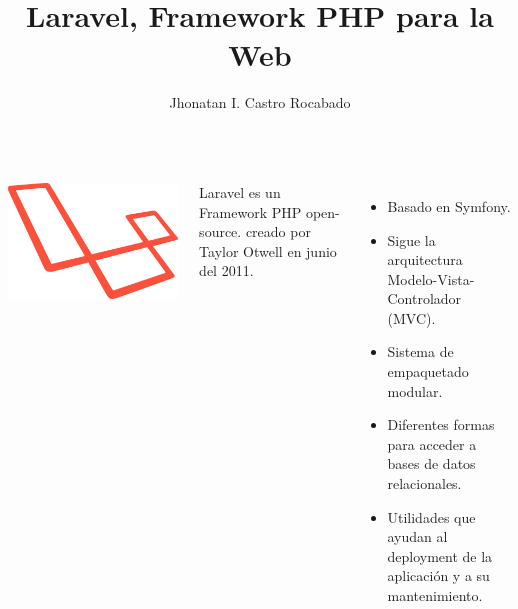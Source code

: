 \documentclass{beamer} %
\title{Laravel, Framework PHP para la Web}
\author{Jhonatan I. Castro Rocabado}
\begin{document}
\frame{\titlepage} %

\begin{frame}
  \begin{columns}
    \begin{center}
      \includegraphics[scale=0.7]{LaravelLogo}
    \end{center}    
    Laravel es un Framework PHP open-source. creado por Taylor Otwell en junio del 2011. \pause

    \begin{itemize}[<+-| alert@+>]
    \item Basado en Symfony.
    \item Sigue la arquitectura Modelo-Vista-Controlador (MVC).
    \item Sistema de empaquetado modular.
    \item Diferentes formas para acceder a bases de datos relacionales.
    \item Utilidades que ayudan al deployment de la aplicación y a su mantenimiento.
    \end{itemize}
  \end{columns}
\end{frame}
\end{document}
